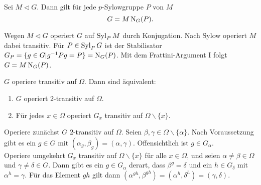 \begin{satz}
 Sei $M \lhd G$. Dann gilt f\"ur jede $p$-Sylowgruppe $P$ von $M$ $$G=M\operatorname{N}_G(P).$$
\end{satz}
\begin{beweis}
 Wegen $M \lhd G$ operiert $G$ auf $\operatorname{Syl}_PM$ durch Konjugation. Nach Sylow operiert $M$ dabei transitiv. F\"ur $P\in \operatorname{Syl}_PG$ ist der Stabilisator $G_P=\lbrace g\in G|g^{-1}Pg=P\rbrace =\operatorname{N}_G(P)$. Mit dem Frattini-Argument I folgt $G=M\operatorname{N}_G(P)$. 
\end{beweis}

\begin{satz}
 $G$ operiere transitiv auf $\Omega$. Dann sind \"aquivalent:
\begin{enumerate}
 \item $G$ operiert $2$-transitiv auf $\Omega$.
 \item F\"ur jedes $x\in\Omega$ operiert $G_x$ transitiv auf $\Omega\backslash\lbrace x\rbrace$.
\end{enumerate}

\end{satz}
\begin{beweis}
 Operiere zun\"achst $G$ $2$-transitiv auf $\Omega$. Seien $\beta,\gamma\in\Omega\backslash\lbrace\alpha\rbrace$. Nach Voraussetzung gibt es ein $g\in G$ mit $(\alpha_g,\beta_g)=(\alpha,\gamma)$. Offensichtlich ist $g\in G_\alpha$.\\
Operiere umgekehrt $G_x$ transitiv auf $\Omega\backslash\lbrace x\rbrace$ f\"ur alle $x\in\Omega$, und seien $\alpha\neq\beta\in\Omega$ und $\gamma\neq\delta\in G$. Dann gibt es ein $g\in G_\alpha$ derart, dass $\beta^g=\delta$ und ein $h\in G_\delta$ mit $\alpha^h=\gamma$. F\"ur das Element $gh$ gilt dann $(\alpha^{gh},\beta^{gh})=(\alpha^h,\delta^h)=(\gamma,\delta)$.
\end{beweis}



